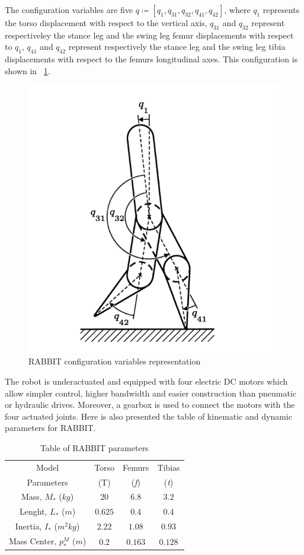 \documentclass[11pt]{article}
\begin{document}
The configuration variables are five $q \coloneqq [q_1, q_{31}, q_{32}, q_{41}, q_{42}]$, where $q_1$ represents the torso displacement with respect to the vertical axis, $q_{31}$ and $q_{32}$ represent respectiveley the stance leg and the swing leg femur displacements with respect to $q_{1}$, $q_{41}$ and $q_{42}$ represent respectively the stance leg and the swing leg tibia displacements with respect to the femurs longitudinal axes. This configuration is shown in \figurename \, \ref{fig: RABBIT}. 

\begin{figure}[H]
\centering
\includegraphics[width=.45\textwidth]{Images/RABBIT.png}
\caption{RABBIT configuration variables representation}
\label{fig: RABBIT}
\end{figure}

The robot is underactuated and equipped with four electric DC motors which allow simpler control, higher bandwidth and easier construction than pneumatic or hydraulic drives. Moreover, a gearbox is used to connect the motors with the four actuated joints. Here is also presented the table of kinematic and dynamic parameters for RABBIT.\\
\begin{table}[H]
\centering
\caption{Table of RABBIT parameters}
\begin{tabular}{cccc}
\toprule
Model  & Torso & Femurs & Tibias \\
Parameters & (T) & (\textit{f}) & (\textit{t})\\
\midrule
Mass, $M_*$ ($kg$) & $20$ & $6.8$ & $3.2$ \\
Lenght, $L_*$ ($m$) & $0.625$ & $0.4$ & $0.4$\\
Inertia, $I_*$ ($m^2kg$) & $2.22$ & $1.08$ & $0.93$\\
Mass Center, $p^M_*$ ($m$) & $0.2$ & $0.163$ & $0.128$\\
\bottomrule
\end{tabular}
\end{table}
\end{document}
